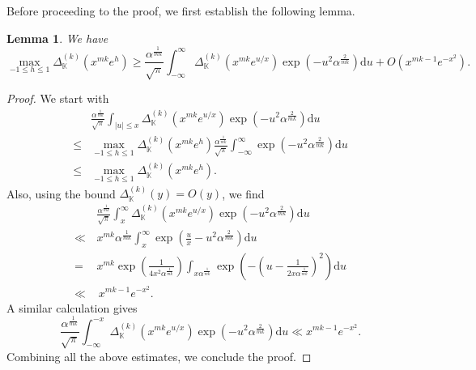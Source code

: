\documentclass[reqno]{amsart}
\numberwithin{equation}{section}
\theoremstyle{plain}
\newtheorem{lemma}[theorem]{Lemma}
\begin{document}
 Before proceeding to the proof, we first establish the following lemma.
       \begin{lemma}
      	We have 
       	\begin{equation*}
       		\max_{-1\leq h\leq 1} \Delta_{\mathbb{K}}^{(k)}\left(x^{mk}e^h\right) \geq \frac{\alpha^{\frac{1}{mk}}}{\sqrt{\pi}} \int_{-\infty}^{\infty} \Delta_{\mathbb{K}}^{(k)}\left(x^{mk}e^{u/x}\right) \exp\left(-u^2\alpha^{\frac{2}{mk}}\right)\mathrm{d}u +O(x^{mk-1}e^{-x^2}).
       	\end{equation*}
       \end{lemma}
       \begin{proof}
       	We start with 
       	\begin{align*}
       		&\frac{\alpha^{\frac{1}{mk}}}{\sqrt{\pi}} \int_{|u|\leq x} \Delta_{\mathbb{K}}^{(k)}\left(x^{mk}e^{u/x}\right) \exp\left(-u^2\alpha^{\frac{2}{mk}}\right)\mathrm{d}u \\
       		\leq &\max_{-1\leq h\leq 1} \Delta_{\mathbb{K}}^{(k)}\left(x^{mk}e^h\right) \frac{\alpha^{\frac{1}{mk}}}{\sqrt{\pi}}\int_{-\infty}^{\infty} \exp\left(-u^2\alpha^{\frac{2}{mk}}\right) \mathrm{d}u \\
       		\leq & \max_{-1\leq h\leq 1} \Delta_{\mathbb{K}}^{(k)}\left(x^{mk}e^h\right).
       	\end{align*}
       Also, using the bound $\Delta_{\mathbb{K}}^{(k)}\left(y\right) = O(y)$, we find
       \begin{align*}
       &\frac{\alpha^{\frac{1}{mk}}}{\sqrt{\pi}}	\int_{x}^{\infty}\Delta_{\mathbb{K}}^{(k)}\left(x^{mk}e^{u/x}\right) \exp\left(-u^2\alpha^{\frac{2}{mk}}\right)\mathrm{d}u\\
       \ll \,& x^{mk} \alpha^{\frac{1}{mk}} \int_{x}^{\infty} \exp\left( \frac{u}{x}- u^2\alpha^{\frac{2}{mk}}\right)\mathrm{d}u\\
       =\, &x^{mk} \exp\left(\frac{1}{4x^2\alpha^{\frac{1}{mk}}}\right) \int_{x\alpha^{\frac{1}{mk}}} \exp\left( - \left(u-\frac{1}{2x\alpha^{\frac{1}{mk}}}\right)^2\right)\mathrm{d}u\\
      \ll & \, x^{mk-1} e^{-x^2}.
       \end{align*}
    A similar calculation gives 
   \begin{equation*}
   	\frac{\alpha^{\frac{1}{mk}}}{\sqrt{\pi}}	\int_{-\infty}^{-x}\Delta_{\mathbb{K}}^{(k)}\left(x^{mk}e^{u/x}\right) \exp\left(-u^2\alpha^{\frac{2}{mk}}\right)\mathrm{d}u \ll x^{mk-1} e^{-x^2}.
   \end{equation*}
Combining all the above estimates, we conclude the proof.
       \end{proof}
\end{document}
